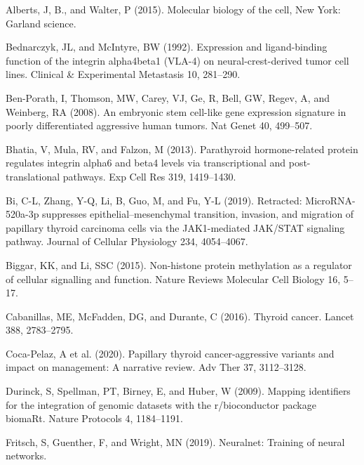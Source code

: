 \documentclass[
  parskip,
  oneside]{scrreprt}
\newlength{\cslhangindent}
\newlength{\cslentryspacingunit} %
\newenvironment{CSLReferences}[2] %
 {%
  \setlength{\parindent}{0pt}
  \ifodd #1
  \let\oldpar\par
  \def\par{\hangindent=\cslhangindent\oldpar}
  \fi
  \setlength{\parskip}{#2\cslentryspacingunit}
 }%
 {}
\begin{document}
\hypertarget{refs}{}
\begin{CSLReferences}{0}{0}
\leavevmode{}%
Alberts, J, B., and Walter, P (2015). Molecular biology of the cell, New
York: Garland science.

\leavevmode{}%
Bednarczyk, JL, and McIntyre, BW (1992). Expression and ligand-binding
function of the integrin alpha4beta1 (VLA-4) on neural-crest-derived
tumor cell lines. Clinical \& Experimental Metastasis 10, 281--290.

\leavevmode{}%
Ben-Porath, I, Thomson, MW, Carey, VJ, Ge, R, Bell, GW, Regev, A, and
Weinberg, RA (2008). An embryonic stem cell-like gene expression
signature in poorly differentiated aggressive human tumors. Nat Genet
40, 499--507.

\leavevmode{}%
Bhatia, V, Mula, RV, and Falzon, M (2013). Parathyroid hormone-related
protein regulates integrin alpha6 and beta4 levels via transcriptional
and post-translational pathways. Exp Cell Res 319, 1419--1430.

\leavevmode{}%
Bi, C-L, Zhang, Y-Q, Li, B, Guo, M, and Fu, Y-L (2019). Retracted:
MicroRNA-520a-3p suppresses epithelial--mesenchymal transition,
invasion, and migration of papillary thyroid carcinoma cells via the
JAK1-mediated JAK/STAT signaling pathway. Journal of Cellular Physiology
234, 4054--4067.

\leavevmode{}%
Biggar, KK, and Li, SSC (2015). Non-histone protein methylation as a
regulator of cellular signalling and function. Nature Reviews Molecular
Cell Biology 16, 5--17.

\leavevmode{}%
Cabanillas, ME, McFadden, DG, and Durante, C (2016). Thyroid cancer.
Lancet 388, 2783--2795.

\leavevmode{}%
Coca-Pelaz, A et al. (2020). Papillary thyroid cancer-aggressive
variants and impact on management: A narrative review. Adv Ther 37,
3112--3128.

\leavevmode{}%
Durinck, S, Spellman, PT, Birney, E, and Huber, W (2009). Mapping
identifiers for the integration of genomic datasets with the
r/bioconductor package biomaRt. Nature Protocols 4, 1184--1191.

\leavevmode{}%
Fritsch, S, Guenther, F, and Wright, MN (2019). Neuralnet: Training of
neural networks.


\end{CSLReferences}
\end{document}
